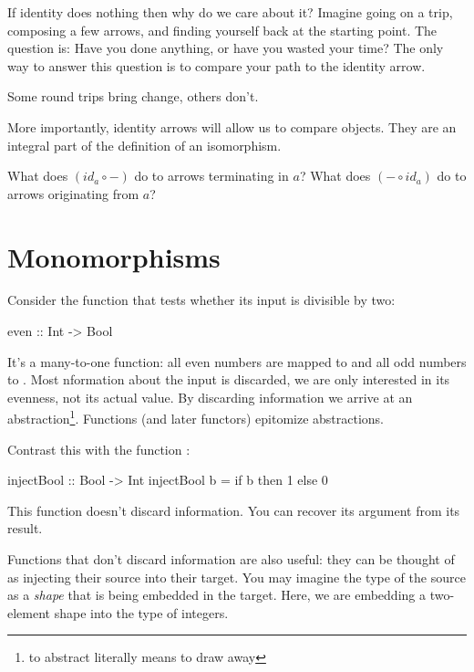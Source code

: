 \documentclass[DaoFP]{subfiles}
\begin{document}
If identity does nothing then why do we care about it? Imagine going on a trip, composing a few arrows, and finding yourself back at the starting point. The question is: Have you done anything, or have you wasted your time? The only way to answer this question is to compare your path to the identity arrow. 

Some round trips bring change, others don't.

More importantly, identity arrows will allow us to compare objects. They are an integral part of the definition of an isomorphism.

\begin{exercise}\label{ex-yoneda-identity}
What does $(id_a \circ -)$ do to arrows terminating in $a$? What does $(- \circ id_a)$ do to arrows originating from $a$?
\end{exercise}

\section{Monomorphisms}

Consider the function  that tests whether its input is divisible by two:
\begin{haskell}
even :: Int -> Bool
\end{haskell}
It's a many-to-one function: all even numbers are mapped to  and all odd numbers to . Most nformation about the input is discarded, we are only interested in its evenness, not its actual value. By discarding information we arrive at an abstraction\footnote{to abstract literally means to draw away}. Functions (and later functors) epitomize abstractions.

Contrast this with the function :
\begin{haskell}
injectBool :: Bool -> Int
injectBool b = if b then 1 else 0
\end{haskell}
This function doesn't discard information. You can recover its argument from its result. 

Functions that don't discard information are also useful: they can be thought of as injecting their source into their target. You may imagine the type of the source as a \emph{shape} that is being embedded in the target. Here, we are embedding a two-element shape  into the type of integers. 
\end{document}
